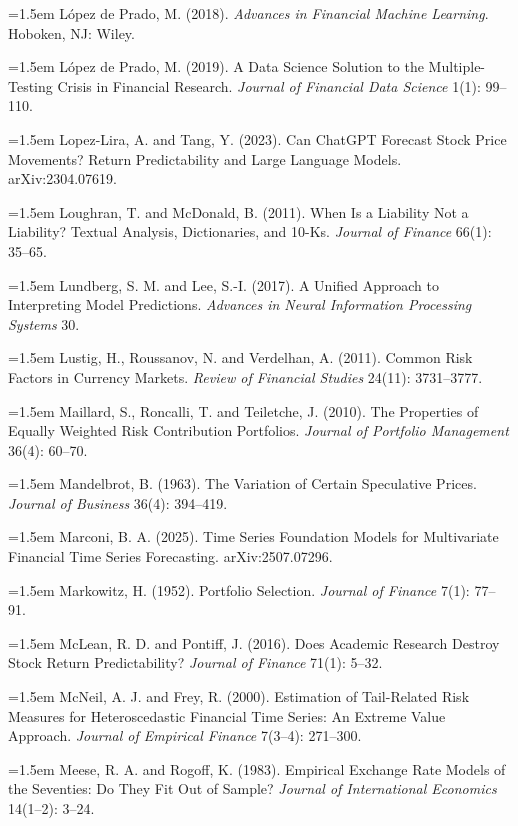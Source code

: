 \hangindent=1.5em L\'opez de Prado, M. (2018). \emph{Advances in Financial Machine Learning}. Hoboken, NJ: Wiley.

\hangindent=1.5em L\'opez de Prado, M. (2019). A Data Science Solution to the Multiple-Testing Crisis in Financial Research. \emph{Journal of Financial Data Science} 1(1): 99--110.

\hangindent=1.5em Lopez-Lira, A. and Tang, Y. (2023). Can ChatGPT Forecast Stock Price Movements? Return Predictability and Large Language Models. arXiv:2304.07619.

\hangindent=1.5em Loughran, T. and McDonald, B. (2011). When Is a Liability Not a Liability? Textual Analysis, Dictionaries, and 10-Ks. \emph{Journal of Finance} 66(1): 35--65.

\hangindent=1.5em Lundberg, S. M. and Lee, S.-I. (2017). A Unified Approach to Interpreting Model Predictions. \emph{Advances in Neural Information Processing Systems} 30.

\hangindent=1.5em Lustig, H., Roussanov, N. and Verdelhan, A. (2011). Common Risk Factors in Currency Markets. \emph{Review of Financial Studies} 24(11): 3731--3777.

\hangindent=1.5em Maillard, S., Roncalli, T. and Teiletche, J. (2010). The Properties of Equally Weighted Risk Contribution Portfolios. \emph{Journal of Portfolio Management} 36(4): 60--70.

\hangindent=1.5em Mandelbrot, B. (1963). The Variation of Certain Speculative Prices. \emph{Journal of Business} 36(4): 394--419.

\hangindent=1.5em Marconi, B. A. (2025). Time Series Foundation Models for Multivariate Financial Time Series Forecasting. arXiv:2507.07296.

\hangindent=1.5em Markowitz, H. (1952). Portfolio Selection. \emph{Journal of Finance} 7(1): 77--91.

\hangindent=1.5em McLean, R. D. and Pontiff, J. (2016). Does Academic Research Destroy Stock Return Predictability? \emph{Journal of Finance} 71(1): 5--32.

\hangindent=1.5em McNeil, A. J. and Frey, R. (2000). Estimation of Tail-Related Risk Measures for Heteroscedastic Financial Time Series: An Extreme Value Approach. \emph{Journal of Empirical Finance} 7(3--4): 271--300.

\hangindent=1.5em Meese, R. A. and Rogoff, K. (1983). Empirical Exchange Rate Models of the Seventies: Do They Fit Out of Sample? \emph{Journal of International Economics} 14(1--2): 3--24.

